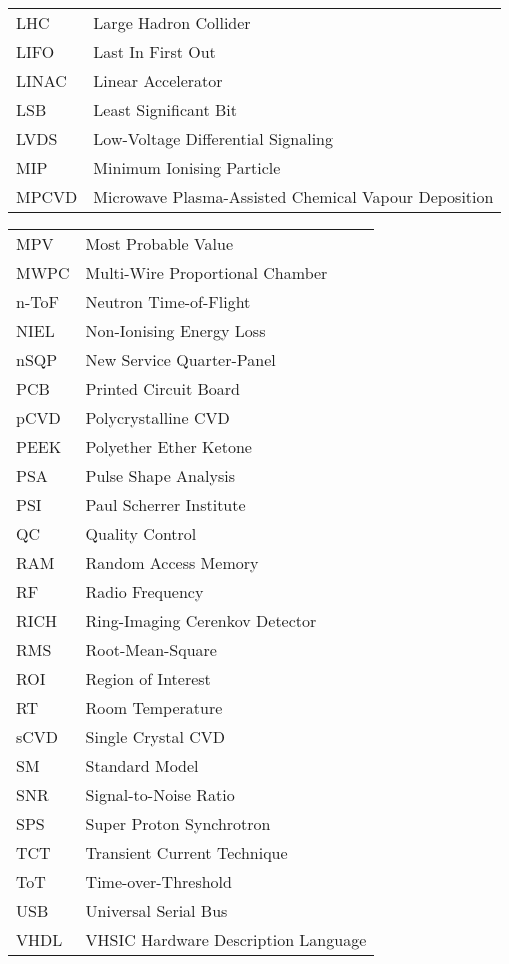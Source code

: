 \begin{acronyms}
\begin{tabular}{l*{1}{l}}
LHC	&	Large Hadron Collider	\\
LIFO	&	Last In First Out	\\
LINAC	&	Linear Accelerator	\\
LSB	&	Least Significant Bit	\\
LVDS	&	Low-Voltage Differential Signaling	\\
MIP	&	Minimum Ionising Particle	\\
MPCVD	&	Microwave Plasma-Assisted Chemical Vapour Deposition	\\
\end{tabular}
\clearpage
\begin{tabular}{l*{1}{l}}
MPV	&	Most Probable Value	\\
MWPC	&	Multi-Wire Proportional Chamber	\\
n-ToF	&	Neutron Time-of-Flight	\\
NIEL	&	Non-Ionising Energy Loss	\\
nSQP	&	New Service Quarter-Panel	\\
PCB	&	Printed Circuit Board	\\
pCVD	&	Polycrystalline CVD	\\
PEEK	&	Polyether Ether Ketone	\\
PSA	&	Pulse Shape Analysis	\\
PSI	&	Paul Scherrer Institute	\\
QC	&	Quality Control	\\
RAM	&	Random Access Memory	\\
RF	&	Radio Frequency	\\
RICH	&	Ring-Imaging Cerenkov Detector	\\
RMS	&	Root-Mean-Square	\\
ROI	&	Region of Interest	\\
RT	&	Room Temperature	\\
sCVD	&	Single Crystal CVD	\\
SM	&	Standard Model	\\
SNR	&	Signal-to-Noise Ratio	\\
SPS	&	Super Proton Synchrotron	\\
TCT	&	Transient Current Technique	\\
ToT	&	Time-over-Threshold	\\
USB	&	Universal Serial Bus	\\
VHDL	&	VHSIC Hardware Description Language	\\
\end{tabular}




\end{acronyms}